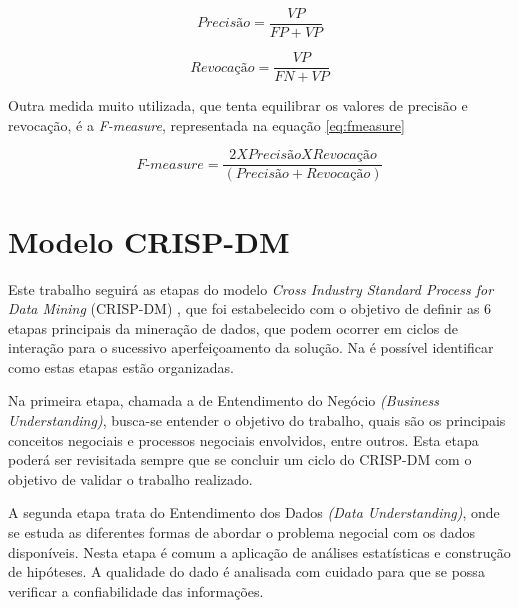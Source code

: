 \begin{equation}\label{eq:precisao}
Precisão = \frac{VP}{FP+VP}
\end{equation}

\begin{equation}\label{eq:revocacao}
Revocação = \frac{VP}{FN+VP}
\end{equation}

Outra medida muito utilizada, que tenta equilibrar os valores de precisão e revocação, é a \textit{F-measure}, representada na equação \ref{eq:fmeasure}

\begin{equation}\label{eq:fmeasure}
\textit{F-measure} = \frac{2 X Precisão X Revocação}{(Precisão + Revocação)}
\end{equation}


\section{Modelo CRISP-DM}%

Este trabalho seguirá as etapas do modelo \textit{Cross Industry Standard Process for Data Mining} (CRISP-DM) \cite{crispdm}, que foi estabelecido com o objetivo de definir as 6 etapas principais da mineração de dados, que podem ocorrer em ciclos de interação para o sucessivo aperfeiçoamento da solução. Na  é possível identificar como estas etapas estão organizadas. 

%

    Na primeira etapa, chamada a de Entendimento do Negócio \textit{(Business Understanding)}, busca-se entender o objetivo do trabalho, quais são os principais conceitos negociais e processos negociais envolvidos, entre outros. Esta etapa poderá ser revisitada sempre que se concluir um ciclo do CRISP-DM com o objetivo de validar o trabalho realizado. 
    
A segunda etapa trata do Entendimento dos Dados \textit{(Data Understanding)}, onde se estuda as diferentes formas de abordar o problema negocial com os dados disponíveis. Nesta etapa é comum a aplicação de análises estatísticas e construção de hipóteses. A qualidade do dado é analisada com cuidado para que se possa verificar a confiabilidade das informações. 

